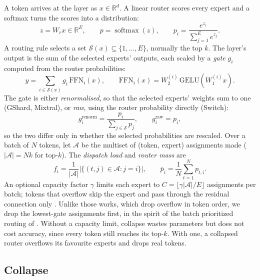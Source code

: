 \documentclass[10pt]{article}
\theoremstyle{definition}
\theoremstyle{remark}
\newcommand{\FFN}{\mathrm{FFN}}
\begin{document}
A token arrives at the layer as $x\in\mathbb{R}^d$. A linear router scores every expert and a softmax turns the scores into a distribution:
\begin{equation}
  z = W_r x \in \mathbb{R}^E, \qquad p = \operatorname{softmax}(z), \qquad p_i = \frac{e^{z_i}}{\sum_{j=1}^E e^{z_j}}.
\end{equation}
A routing rule selects a set $\mathcal{S}(x)\subseteq\{1,\dots,E\}$, normally the top $k$. The layer's output is the sum of the selected experts' outputs, each scaled by a \emph{gate} $g_i$ computed from the router probabilities:
\begin{equation}
  y = \sum_{i\in\mathcal{S}(x)} g_i\,\FFN_i(x), \qquad \FFN_i(x) = W_2^{(i)}\,\mathrm{GELU}\!\left(W_1^{(i)}x\right).
\end{equation}
The gate is either \emph{renormalised}, so that the selected experts' weights sum to one (GShard, Mixtral), or \emph{raw}, using the router probability directly (Switch):
\begin{equation}
  g_i^{\text{renorm}} = \frac{p_i}{\sum_{j\in\mathcal{S}} p_j}, \qquad g_i^{\text{raw}} = p_i ,
  \label{eq:gates}
\end{equation}
so the two differ only in whether the selected probabilities are rescaled. Over a batch of $N$ tokens, let $\mathcal{A}$ be the multiset of (token, expert) assignments made ($|\mathcal{A}|=Nk$ for top-$k$). The \emph{dispatch load} and \emph{router mass} are
\begin{equation}
  f_i = \frac{1}{|\mathcal{A}|}\bigl|\{(t,j)\in\mathcal{A}: j=i\}\bigr|, \qquad \bar p_i = \frac{1}{N}\sum_{t=1}^N p_{t,i}.
\end{equation}
An optional capacity factor $\gamma$ limits each expert to $C=\lfloor\gamma|\mathcal{A}|/E\rfloor$ assignments per batch; tokens that overflow skip the expert and pass through the residual connection only \citep{lepikhin2021gshard,fedus2022switch}. Unlike those works, which drop overflow in token order, we drop the lowest-gate assignments first, in the spirit of the batch prioritized routing of \citet{riquelme2021vmoe}. Without a capacity limit, collapse wastes parameters but does not cost accuracy, since every token still reaches its top-$k$. With one, a collapsed router overflows its favourite experts and drops real tokens.

\subsection{Collapse}
\end{document}
